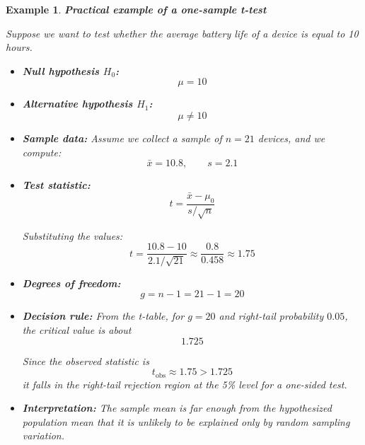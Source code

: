 \documentclass[11pt]{article}
\theoremstyle{smallexample}
\newtheorem{example}{Example}[section]
\begin{document}
\begin{example}{\textbf{Practical example of a one-sample t-test}}
    
Suppose we want to test whether the average battery life of a device is equal to 10 hours.

\begin{itemize}
    \item \textbf{Null hypothesis \(H_0\):}
    \[
    \mu = 10
    \]

    \item \textbf{Alternative hypothesis \(H_1\):}
    \[
    \mu \neq 10
    \]

    \item \textbf{Sample data:} Assume we collect a sample of \(n=21\) devices, and we compute:
    \[
    \bar{x}=10.8, \qquad s=2.1
    \]

    \item \textbf{Test statistic:}
    \[
    t=\frac{\bar{x}-\mu_0}{s/\sqrt{n}}
    \]

    Substituting the values:
    \[
    t=\frac{10.8-10}{2.1/\sqrt{21}}
    \approx \frac{0.8}{0.458}
    \approx 1.75
    \]

    \item \textbf{Degrees of freedom:}
    \[
    g=n-1=21-1=20
    \]

    \item \textbf{Decision rule:} From the t-table, for \(g=20\) and right-tail probability \(0.05\), the critical value is about
    \[
    1.725
    \]

    Since the observed statistic is
    \[
    t_{\text{obs}} \approx 1.75 > 1.725
    \]
    it falls in the right-tail rejection region at the 5\% level for a one-sided test.

    \item \textbf{Interpretation:} The sample mean is far enough from the hypothesized population mean that it is unlikely to be explained only by random sampling variation.
\end{itemize}
\end{example}

\vspace{0.3cm}
\end{document}
